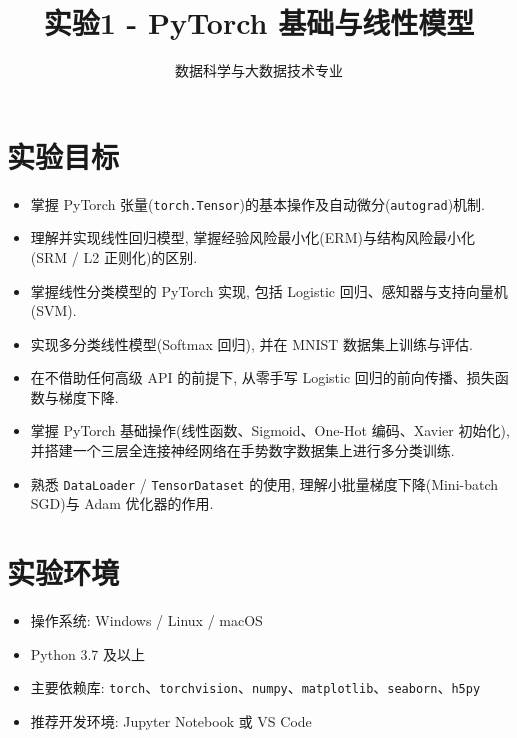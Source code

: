 \documentclass{../../nndlcourse}
\begin{document}
\title{实验1 - PyTorch 基础与线性模型}
\author{数据科学与大数据技术专业}
\date{}
\maketitle


\section{实验目标}
\begin{itemize}
    \item 掌握 PyTorch 张量(\texttt{torch.Tensor})的基本操作及自动微分(\texttt{autograd})机制.
    \item 理解并实现线性回归模型, 掌握经验风险最小化(ERM)与结构风险最小化(SRM / L2 正则化)的区别.
    \item 掌握线性分类模型的 PyTorch 实现, 包括 Logistic 回归、感知器与支持向量机(SVM).
    \item 实现多分类线性模型(Softmax 回归), 并在 MNIST 数据集上训练与评估.
    \item 在不借助任何高级 API 的前提下, 从零手写 Logistic 回归的前向传播、损失函数与梯度下降.
    \item 掌握 PyTorch 基础操作(线性函数、Sigmoid、One-Hot 编码、Xavier 初始化), 并搭建一个三层全连接神经网络在手势数字数据集上进行多分类训练.
    \item 熟悉 \texttt{DataLoader} / \texttt{TensorDataset} 的使用, 理解小批量梯度下降(Mini-batch SGD)与 Adam 优化器的作用.
\end{itemize}

\section{实验环境}
\begin{itemize}
    \item 操作系统: Windows / Linux / macOS
    \item Python 3.7 及以上
    \item 主要依赖库: \texttt{torch}、\texttt{torchvision}、\texttt{numpy}、\texttt{matplotlib}、\texttt{seaborn}、\texttt{h5py}
    \item 推荐开发环境: Jupyter Notebook 或 VS Code
\end{itemize}
\end{document}
